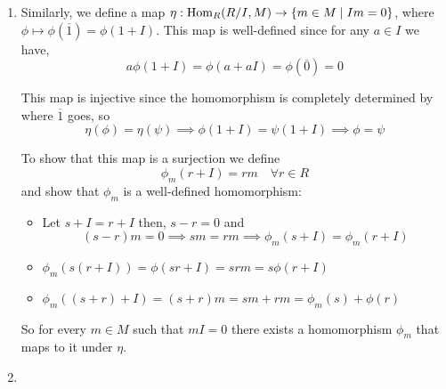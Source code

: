 \documentclass[Notebook.tex]{subfiles}
\begin{document}
\begin{solution}
\begin{enumerate}
           \item Similarly, we define a map $\eta: \operatorname{Hom}_R(R/I, M) \to \left\{m\in M\mid Im=0\right\}$, where $\phi \mapsto \phi(\overline{1}) = \phi(1 + I)$. This map is well-defined since for any $a \in I$ we have, 
           \[a \phi(1 + I) = \phi(a + aI) = \phi(\overline{0}) = 0 \]
           
           This map is injective since the homomorphism is completely determined by where $\overline{1}$ goes, so 
           \[\eta(\phi) = \eta(\psi) \implies \phi(1 + I) = \psi(1 +I) \implies \phi = \psi\] 
           
           To show that this map is a surjection we define 
           \[\phi_m(r + I) = rm \quad \forall r \in R\]
           and show that $\phi_m$ is a well-defined homomorphism: 
           \begin{itemize}
            \item Let $s + I = r +I$ then, $s - r = 0$ and 
            \[(s-r)m = 0 \implies sm = rm \implies \phi_m(s + I) = \phi_m(r+I) \]
            \item $\phi_m(s (r+I)) = \phi (sr + I) = srm = s\phi(r+I)$
            \item $\phi_m((s + r) + I) = (s + r)m = sm + rm = \phi_m(s) + \phi(r)$
           \end{itemize}
           So for every $m \in M$ such that $mI = 0$ there exists a homomorphism $\phi_m$ that maps to it under $\eta$. 

           \item 
        \end{enumerate}    
    \end{solution}
    
\end{document}
